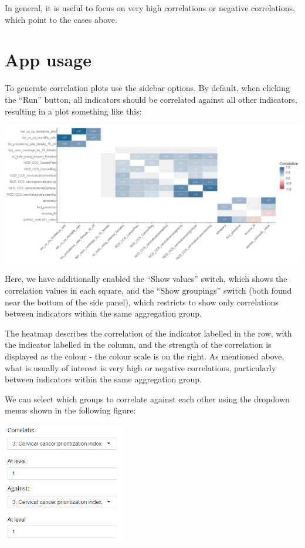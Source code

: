 \documentclass[
  letterpaper,
  DIV=11,
  numbers=noendperiod]{scrreprt}
\begin{document}
In general, it is useful to focus on very high correlations or negative
correlations, which point to the cases above.

\hypertarget{app-usage}{%
\section{App usage}\label{app-usage}}

To generate correlation plots use the sidebar options. By default, when
clicking the ``Run'' button, all indicators should be correlated against
all other indicators, resulting in a plot something like this:

\includegraphics[width=1\textwidth,height=\textheight]{figs/correlations_1.png}

Here, we have additionally enabled the ``Show values'' switch, which
shows the correlation values in each square, and the ``Show groupings''
switch (both found near the bottom of the side panel), which restricts
to show only correlations between indicators within the same aggregation
group.

The heatmap describes the correlation of the indicator labelled in the
row, with the indicator labelled in the column, and the strength of the
correlation is displayed as the colour - the colour scale is on the
right. As mentioned above, what is usually of interest is very high or
negative correlations, particularly between indicators within the same
aggregation group.

We can select which groups to correlate against each other using the
dropdown menus shown in the following figure:

\includegraphics[width=0.4\textwidth,height=\textheight]{figs/correlations_2.png}
\end{document}
